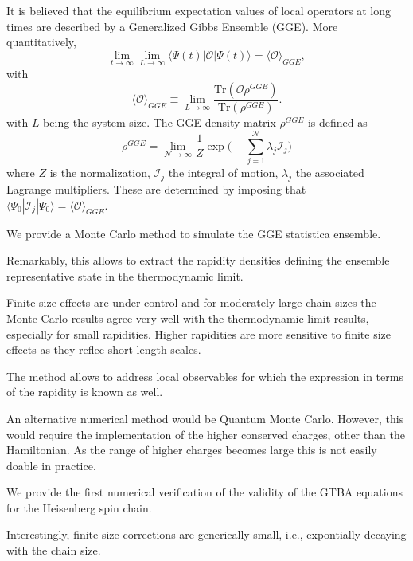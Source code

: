 \documentclass[twocolumn,superscriptaddress,prb,10pt]{revtex4-1}
\begin{document}
It is believed that the equilibrium expectation values of local operators 
at long times are described by a Generalized Gibbs Ensemble (GGE). 
More quantitatively,
%
\begin{equation}
\lim\limits_{t\to\infty}\lim\limits_{L\to\infty}\langle\Psi(t)|{\mathcal O}|
\Psi(t)\rangle=\langle{\mathcal O}\rangle_{GGE},
\end{equation}
%
with
%
\begin{equation}
\langle{\mathcal O}\rangle_{GGE}\equiv\lim\limits_{L\to\infty}\frac{\textrm{Tr}
({\mathcal O}\rho^{GGE})}{\textrm{Tr}(\rho^{GGE})}.
\end{equation}
%
with $L$ being the system size. The GGE density matrix $\rho^{GGE}$ is defined 
as 
%
\begin{equation}
\rho^{GGE}=\lim\limits_{{\mathcal N}\to\infty}
\frac{1}{Z}\exp\Big(-\sum_{j=1}^{{\mathcal N}}\lambda_j{\mathcal I}_j\Big)
\label{rho-gge}
\end{equation}
%
where $Z$ is the normalization, ${\mathcal I}_j$ the integral of motion,
 $\lambda_j$ the associated Lagrange multipliers. These are determined by 
imposing that $\langle\Psi_0|{\mathcal I}_j|\Psi_0\rangle=\langle{\mathcal O}
\rangle_{GGE}$. 


We provide a Monte Carlo method to simulate the GGE statistica ensemble. 

Remarkably, this allows to extract the rapidity densities defining the 
ensemble representative state in the thermodynamic limit. 

Finite-size effects are under control and for moderately large chain sizes 
the Monte Carlo results agree very well with the thermodynamic limit 
results, especially for small rapidities. Higher rapidities are more 
sensitive to finite size effects as they reflec short length scales. 

The method allows to address local observables for which the expression in 
terms of the rapidity is known as well. 

An alternative numerical method would be Quantum Monte Carlo. However, 
this would require the implementation of the higher conserved charges, 
other than the Hamiltonian. As the range of higher charges becomes large 
this is not easily doable in practice. 

We provide the first numerical verification of the validity of the GTBA 
equations for the Heisenberg spin chain. 

Interestingly, finite-size corrections are generically small, i.e., expontially 
decaying with the chain size. 
\end{document}
